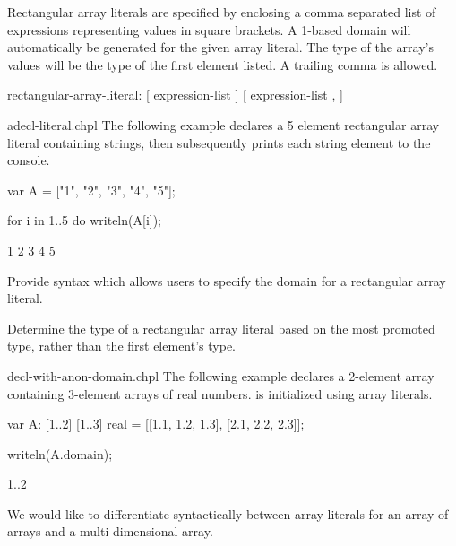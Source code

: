 Rectangular array literals are specified by enclosing a comma separated list of 
expressions representing values in square brackets. A 1-based domain will 
automatically be generated for the given array literal.  The type of the array's 
values will be the type of the first element listed. A trailing comma is
allowed.

\begin{syntax}
rectangular-array-literal:
  [ expression-list ]
  [ expression-list , ]
\end{syntax}

\begin{chapelexample}{adecl-literal.chpl}
The following example declares a 5 element rectangular array literal 
containing strings, then subsequently prints each string element to the console.
\begin{chapel}
var A = ["1", "2", "3", "4", "5"];

for i in 1..5 do
  writeln(A[i]);
\end{chapel}
\begin{chapeloutput}
1
2
3
4
5
\end{chapeloutput}
\end{chapelexample}

\begin{future}
Provide syntax which allows users to specify the domain for a rectangular 
array literal.
\end{future}

\begin{future}
Determine the type of a rectangular array literal based on the most promoted 
type, rather than the first element's type.
\end{future}

\begin{chapelexample}{decl-with-anon-domain.chpl}
The following example declares a 2-element array  containing 3-element
arrays of real numbers.   is initialized using array literals.
\begin{chapel}
var A: [1..2] [1..3] real = [[1.1, 1.2, 1.3], [2.1, 2.2, 2.3]];
\end{chapel}
\begin{chapelpost}
writeln(A.domain);
\end{chapelpost}
\begin{chapeloutput}
{1..2}
\end{chapeloutput}
\end{chapelexample}

\begin{openissue}
We would like to differentiate syntactically between array literals for an array
of arrays and a multi-dimensional array. 
\end{openissue}

